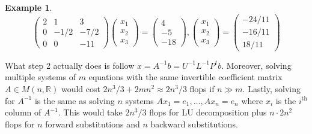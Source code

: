 \documentclass[12pt]{amsart}
\theoremstyle{definition}
\newtheorem{example}[theorem]{Example}
\begin{document}
\begin{example}
$$\left(\begin{array}{ccc} 2 & 1 & 3 \\ 0 & -1/2 & -7/2 \\ 0 & 0 & -11 \end{array}\right)\left(\begin{array}{c} x_1 \\ x_2 \\ x_3 \end{array}\right) = \left(\begin{array}{c} 4 \\ -5 \\-18 \end{array}\right), \left(\begin{array}{c} x_1 \\ x_2 \\ x_3 \end{array}\right) = \left(\begin{array}{c} -24/11 \\ -16/11 \\ 18/11 \end{array}\right)$$
\end{example}

What step 2 actually does is follow $x= A^{-1}b = U^{-1}L^{-1}P^t b$. Moreover, solving multiple systems of $m$ equations with the same invertible coefficient matrix $A \in M(n, \mathbb{R})$  would cost $2n^3/3 + 2mn^2 \approx 2n^3/3$ flops if $n \gg m$. Lastly, solving for $A^{-1}$ is the same as solving $n$ systems $Ax_1 = e_1, \dots , Ax_n = e_n$ where $x_i$ is the $i^{\text{th}}$ column of $A^{-1}$. This would take $2n^3/3$ flops for LU decomposition plus $n \cdot 2n^2$ flops for $n$ forward substitutions and $n$ backward substitutions.
\end{document}
